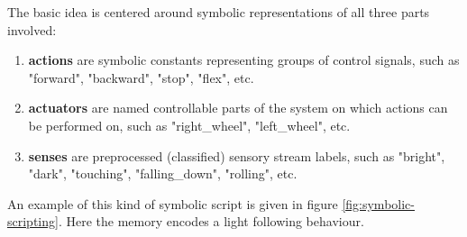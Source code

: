 \documentclass[conference]{IEEEtran}
\begin{document}
The basic idea is centered around symbolic representations of all three parts involved:
\begin{enumerate}
	\item \textbf{actions} are symbolic constants representing groups of control signals, such as "forward", "backward", "stop", "flex", etc.
	
	\item \textbf{actuators} are named controllable parts of the system on which actions can be performed on, such as "right\_wheel", "left\_wheel", etc.
	
	\item \textbf{senses} are preprocessed (classified) sensory stream labels, such as "bright", "dark", "touching", "falling\_down", "rolling", etc.
\end{enumerate}

An example of this kind of symbolic script is given in figure \ref{fig:symbolic-scripting}. Here the memory encodes a light following behaviour.
\end{document}
